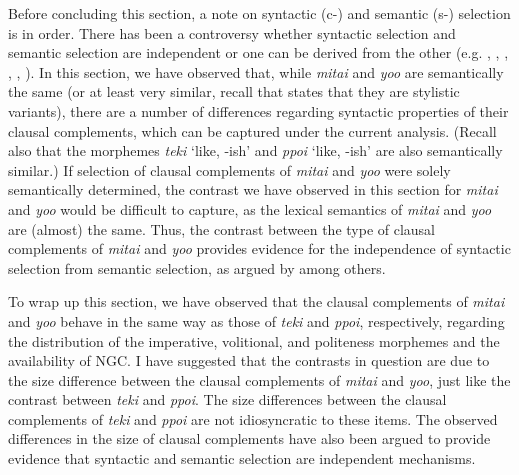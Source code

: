 \documentclass[output=paper]{langscibook}
\begin{document}
Before concluding this section, a note on syntactic (c-) and semantic (s-) selection is in order. There has been a controversy whether syntactic selection and semantic selection are independent or one can be derived from the other (e.g. \citealt{Grimshaw1979}, \citealt{pesetsky1982}, \citealt{PollardSag1987}, \citealt{ChomskyLasnik1993}, \citealt{Bedell1972},  \citealt{Odijk1997}). In this section, we have observed that, while \emph{mitai} and \emph{yoo} are semantically the same (or at least very similar, recall that \citet[169]{Narrog2009} states that they are stylistic variants), there are a number of differences regarding syntactic properties of their clausal complements, which can be captured under the current analysis. (Recall also that the morphemes \emph{teki} ‘like, -ish’ and \emph{ppoi} ‘like, -ish’ are also semantically similar.) If selection of clausal complements of \emph{mitai} and \emph{yoo} were solely semantically determined, the contrast we have observed in this section for \emph{mitai} and \emph{yoo} would be difficult to capture, as the lexical semantics of \emph{mitai} and \emph{yoo} are (almost) the same. Thus, the contrast between the type of clausal complements of \emph{mitai} and \emph{yoo} provides evidence for the independence of syntactic selection from semantic selection, as argued by \citet{Grimshaw1979} among others.

To wrap up this section, we have observed that the clausal complements of \emph{mitai} and \emph{yoo} behave in the same way as those of \emph{teki} and \emph{ppoi}, respectively, regarding the distribution of the imperative, volitional, and politeness morphemes and the availability of NGC. I have suggested that the contrasts in question are due to the size difference between the clausal complements of \emph{mitai} and \emph{yoo}, just like the contrast between \emph{teki} and \emph{ppoi}. The size differences between the clausal complements of \emph{teki} and \emph{ppoi} are not idiosyncratic to these items. The observed differences in the size of clausal complements have also been argued to provide evidence that syntactic and semantic selection are independent mechanisms.
\end{document}
